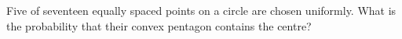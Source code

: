 Five of seventeen equally spaced points on a circle are chosen uniformly. What is the probability that their convex pentagon contains the centre?
